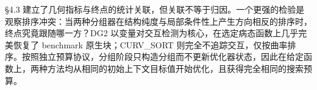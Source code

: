 §4.3 建立了几何指标与终点的统计关联，但关联不等于归因。一个更强的检验是观察排序冲突：当两种分组器在结构纯度与局部条件性上产生方向相反的排序时，终点究竟跟随哪一方？DG2 以变量对交互检测为核心，在选定病态函数上几乎完美恢复了 benchmark 原生块；CURV\_SORT 则完全不追踪交互，仅按曲率排序。按照独立预算协议，分组阶段只构造分组而不更新优化器状态，因此在给定函数上，两种方法均从相同的初始上下文目标值开始优化，且获得完全相同的搜索预算。
